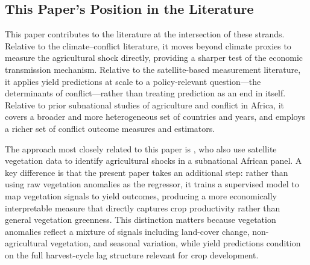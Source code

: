 \subsection{This Paper's Position in the Literature}

This paper contributes to the literature at the intersection of these strands. Relative to the climate--conflict literature, it moves beyond climate proxies to measure the agricultural shock directly, providing a sharper test of the economic transmission mechanism. Relative to the satellite-based measurement literature, it applies yield predictions at scale to a policy-relevant question---the determinants of conflict---rather than treating prediction as an end in itself. Relative to prior subnational studies of agriculture and conflict in Africa, it covers a broader and more heterogeneous set of countries and years, and employs a richer set of conflict outcome measures and estimators.

The approach most closely related to this paper is \citet{HarariLaFerrara2018}, who also use satellite vegetation data to identify agricultural shocks in a subnational African panel. A key difference is that the present paper takes an additional step: rather than using raw vegetation anomalies as the regressor, it trains a supervised model to map vegetation signals to yield outcomes, producing a more economically interpretable measure that directly captures crop productivity rather than general vegetation greenness. This distinction matters because vegetation anomalies reflect a mixture of signals including land-cover change, non-agricultural vegetation, and seasonal variation, while yield predictions condition on the full harvest-cycle lag structure relevant for crop development.
